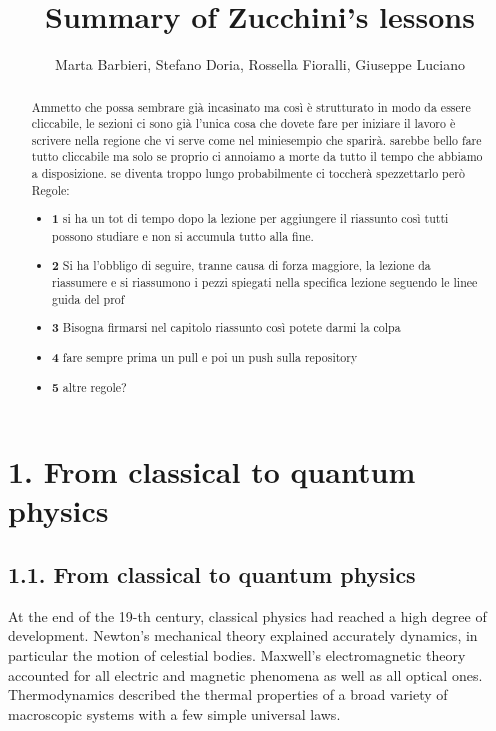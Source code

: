 \documentclass{article}
\title{Summary of Zucchini’s lessons}
\author{Marta Barbieri, Stefano Doria, Rossella Fioralli, Giuseppe Luciano}
\begin{document}
\maketitle
\begin{abstract}
    Ammetto che possa sembrare già incasinato ma così è strutturato in modo da essere cliccabile, le sezioni ci sono già l'unica cosa che dovete fare per iniziare il lavoro è scrivere nella regione che vi serve come nel miniesempio che sparirà. sarebbe bello fare tutto cliccabile ma solo se proprio ci annoiamo a morte da tutto il tempo che abbiamo a disposizione. se diventa troppo lungo probabilmente ci toccherà spezzettarlo però
    Regole:
    \begin{itemize}
\item \textbf{1} 
 si ha un tot di tempo dopo la lezione per aggiungere il riassunto così tutti possono studiare e non si accumula tutto alla fine. 
 
\item \textbf{2} 
Si ha l'obbligo di seguire, tranne causa di forza maggiore, la lezione da riassumere e si riassumono i pezzi spiegati nella specifica lezione seguendo le linee guida del prof 
\item \textbf{3}
Bisogna firmarsi nel capitolo riassunto così potete darmi la colpa
\item \textbf{4}
fare sempre prima un pull e poi un push sulla repository
\item \textbf{5}
altre regole?
\end{itemize}
   
\end{abstract}

\tableofcontents


\section*{1. From classical to quantum physics}

\subsection*{1.1. From classical to quantum physics}

At the end of the 19-th century, classical physics had reached a high degree of development. Newton's mechanical theory explained accurately dynamics, in particular the motion of celestial bodies. Maxwell's electromagnetic theory accounted for all electric and magnetic phenomena as well as all optical ones. Thermodynamics described the thermal properties of a broad variety of macroscopic systems with a few simple universal laws.
\end{document}
